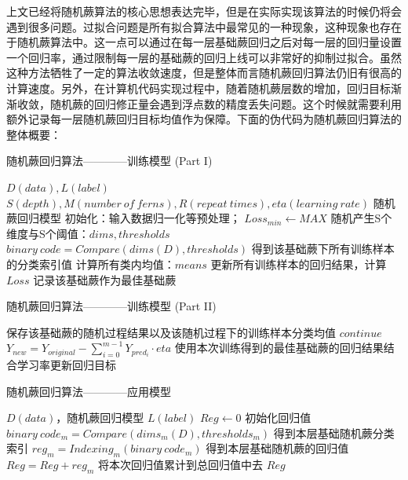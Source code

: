上文已经将随机蕨算法的核心思想表达完毕，但是在实际实现该算法的时候仍将会遇到很多问题。过拟合问题是所有拟合算法中最常见的一种现象，这种现象也存在于随机蕨算法中。这一点可以通过在每一层基础蕨回归之后对每一层的回归量设置一个回归率，通过限制每一层的基础蕨的回归上线可以非常好的抑制过拟合。虽然这种方法牺牲了一定的算法收敛速度，但是整体而言随机蕨回归算法仍旧有很高的计算速度。另外，在计算机代码实现过程中，随着随机蕨层数的增加，回归目标渐渐收敛，随机蕨的回归修正量会遇到浮点数的精度丢失问题。这个时候就需要利用额外记录每一层随机蕨回归目标均值作为保障。下面的伪代码为随机蕨回归算法的整体概要：
\newline

\begin{algorithm}
\caption{随机蕨回归算法————训练模型 (Part I)}
\begin{algorithmic}[1]
\Require $D(data), L(label)$
\Require $S(depth), M(number\ of\ ferns), R(repeat\ times), eta(learning\ rate)$
\Ensure 随机蕨回归模型
\State 初始化：输入数据归一化等预处理；
	\State $Loss_{min}\leftarrow MAX$
		\State 随机产生S个维度与S个阈值：$dims, thresholds$
		\State $binary\ code=Compare(dims(D), thresholds)$
		\State \Comment 得到该基础蕨下所有训练样本的分类索引值
		\State 计算所有类内均值：$means$
		\State 更新所有训练样本的回归结果，计算$Loss$
			\State 记录该基础蕨作为最佳基础蕨
\end{algorithmic}
\end{algorithm}

\begin{algorithm}
\caption*{随机蕨回归算法————训练模型 (Part II)}
\begin{algorithmic}[1]
			\State 保存该基础蕨的随机过程结果以及该随机过程下的训练样本分类均值
		\Else 
			\State $continue$
		\EndIf
	\EndFor
	\State $Y_{new}=Y_{original}-\sum_{i=0}^{m-1} Y_{pred_i}\cdot eta$
	\State \Comment 使用本次训练得到的最佳基础蕨的回归结果结合学习率更新回归目标
\EndFor
\end{algorithmic}
\end{algorithm}


\begin{algorithm}
\caption{随机蕨回归算法————应用模型}
\begin{algorithmic}[1]
\Require $D(data)$，随机蕨回归模型
\Ensure $L(label)$
\State $Reg\leftarrow 0$
\Comment 初始化回归值
	\State $binary\ code_m=Compare(dims_m(D), thresholds_m)$
	\Comment 得到本层基础随机蕨分类索引
	\State $reg_m=Indexing_m(binary\ code_m)$
	\Comment 得到本层基础随机蕨的回归值
	\State $Reg=Reg+reg_m$
	\Comment 将本次回归值累计到总回归值中去
\EndFor
\State \Return $Reg$
\end{algorithmic}
\end{algorithm}


